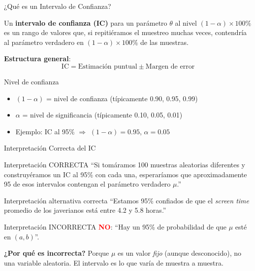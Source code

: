 \documentclass[aspectratio=169, 11pt]{beamer}
\begin{document}
\begin{frame}{¿Qué es un Intervalo de Confianza?}
\begin{definition}
Un \textbf{intervalo de confianza (IC)} para un parámetro $\theta$ al nivel $(1-\alpha) \times 100\%$ es un rango de valores que, si repitiéramos el muestreo muchas veces, contendría al parámetro verdadero en $(1-\alpha) \times 100\%$ de las muestras.
\end{definition}

\vspace{0.3cm}
\textbf{Estructura general}:
\[
\text{IC} = \text{Estimación puntual} \pm \text{Margen de error}
\]

\vspace{0.3cm}
\begin{block}{Nivel de confianza}
\begin{itemize}
  \item $(1-\alpha)$ = nivel de confianza (típicamente 0.90, 0.95, 0.99)
  \item $\alpha$ = nivel de significancia (típicamente 0.10, 0.05, 0.01)
  \item Ejemplo: IC al 95\% $\Rightarrow$ $(1-\alpha) = 0.95$, $\alpha = 0.05$
\end{itemize}
\end{block}
\end{frame}

\begin{frame}{Interpretación Correcta del IC}
\begin{alertblock}{Interpretaci\'on CORRECTA}
``Si tom\'aramos 100 muestras aleatorias diferentes y construy\'eramos un IC al 95\% con cada una, esperar\'iamos que aproximadamente \alert{95 de esos intervalos} contengan el par\'ametro verdadero $\mu$.''
\end{alertblock}

\smallskip
\begin{exampleblock}{Interpretaci\'on alternativa correcta}
``Estamos 95\% confiados de que el \emph{screen time} promedio de los javerianos est\'a entre 4.2 y 5.8 horas.''
\end{exampleblock}

\smallskip
\begin{block}{Interpretaci\'on INCORRECTA}
\textcolor{red}{\textbf{NO}}: ``Hay un 95\% de probabilidad de que $\mu$ esté en $(a, b)$''.

\vspace{0.2cm}
\textbf{¿Por qué es incorrecta?} Porque $\mu$ es un valor \emph{fijo} (aunque desconocido), no una variable aleatoria. El intervalo es lo que varía de muestra a muestra.
\end{block}
\end{frame}
\end{document}
